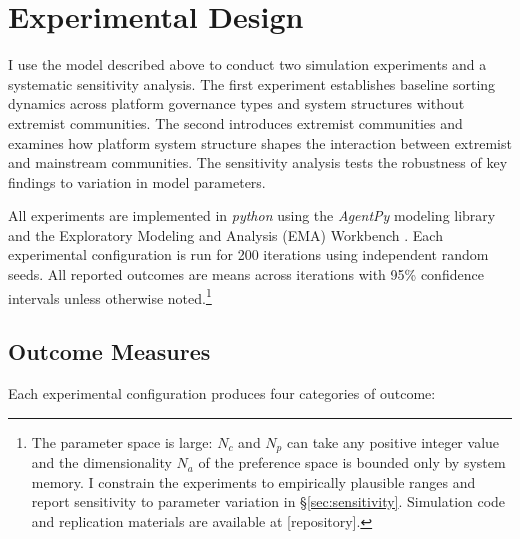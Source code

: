 \documentclass[12pt]{article}
\begin{document}


\section{Experimental Design}
\label{sec:experiments}

I use the model described above to conduct two simulation experiments and a systematic sensitivity analysis. The first experiment establishes baseline sorting dynamics across platform governance types and system structures without extremist communities. The second introduces extremist communities and examines how platform system structure shapes the interaction between extremist and mainstream communities. The sensitivity analysis tests the robustness of key findings to variation in model parameters.

All experiments are implemented in \textit{python} using the \textit{AgentPy} modeling library \citep{foramitti2021agentpy} and the Exploratory Modeling and Analysis (EMA) Workbench \citep{bankesExploratoryModelingPolicy1993}. Each experimental configuration is run for 200 iterations using independent random seeds. All reported outcomes are means across iterations with 95\% confidence intervals unless otherwise noted.\footnote{The parameter space is large: $N_c$ and $N_p$ can take any positive integer value and the dimensionality $N_a$ of the preference space is bounded only by system memory. I constrain the experiments to empirically plausible ranges and report sensitivity to parameter variation in \S\ref{sec:sensitivity}. Simulation code and replication materials are available at [repository].}

\subsection{Outcome Measures}
\label{sec:outcomes}

Each experimental configuration produces four categories of outcome:
\end{document}
